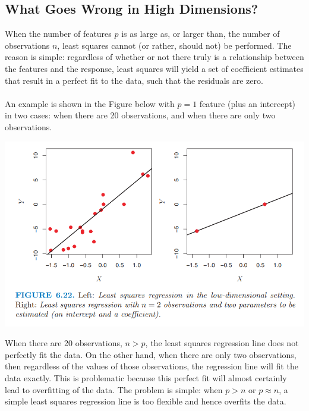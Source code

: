 \subsection{What Goes Wrong in High Dimensions?}
When the number of features $p$ is as large as, or larger than, the number of observations $n$, least squares cannot (or rather,
should not) be performed. The reason is simple: regardless of whether or not there truly is a relationship between the features and the response, least squares will yield a set of coefficient estimates that result in a perfect fit to the data, such that the residuals are zero.\\\\
An example is shown in the Figure below with $p = 1$ feature (plus an intercept) in two cases: when there are 20 observations, and when there are only two observations.
\begin{center}
    \includegraphics[scale=0.7]{images/high-dimensional.png}
\end{center}
When there are 20 observations, $n>p$, the least squares regression line does not perfectly fit the data. On the other hand, when there are only two observations, then regardless of the values of those observations, the regression line will fit the data exactly. This is problematic because this perfect fit will almost certainly lead to overfitting of the data. The problem is simple: when $p>n$ or $p \approx n$, a simple least squares regression line is too flexible and hence overfits the data.

